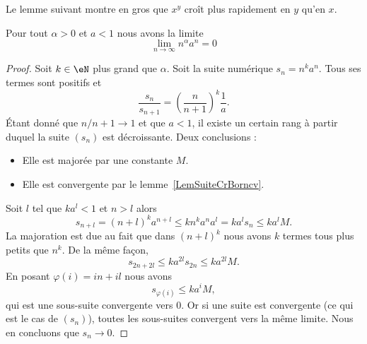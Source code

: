 Le lemme suivant montre en gros que \( x^y\) croît plus rapidement en \( y\) qu'en \( x\).
\begin{lemma}       \label{LemLJOSooEiNtTs}
	Pour tout \( \alpha>0\) et \( a<1\) nous avons la limite
	\begin{equation}
		\lim_{n\to \infty} n^{\alpha}a^n=0
	\end{equation}
\end{lemma}

\begin{proof}
	Soit \( k\in \eN\) plus grand que \( \alpha\).
	Soit la suite numérique \( s_n=n^ka^n\). Tous ses termes sont positifs et
	\begin{equation}
		\frac{ s_n }{ s_{n+1} }=\left( \frac{ n }{ n+1 } \right)^k\frac{1}{ a }.
	\end{equation}
	Étant donné que \( n/n+1\to 1\) et que \( a<1\), il existe un certain rang à partir duquel la suite \( (s_n)\) est décroissante. Deux conclusions :
	\begin{itemize}
		\item Elle est majorée par une constante \( M\).
		\item Elle est convergente par le lemme~\ref{LemSuiteCrBorncv}.
	\end{itemize}
	Soit \( l\) tel que \( ka^l<1\) et \( n>l\) alors
	\begin{equation}
		s_{n+l}=(n+l)^ka^{n+l}\leq kn^ka^na^l=ka^ls_n\leq ka^lM.
	\end{equation}
	La majoration est due au fait que dans \( (n+l)^k\) nous avons \( k\) termes tous plus petits que \( n^k\). De la même façon,
	\begin{equation}
		s_{2n+2l}\leq ka^{2l}s_{2n}\leq ka^{2l}M.
	\end{equation}
	En posant \( \varphi(i)=in+il\) nous avons
	\begin{equation}
		s_{\varphi(i)}\leq ka^iM,
	\end{equation}
	qui est une sous-suite convergente vers \( 0\). Or si une suite est convergente (ce qui est le cas de \( (s_n)\)), toutes les sous-suites convergent vers la même limite. Nous en concluons que \( s_n\to 0\).
\end{proof}

